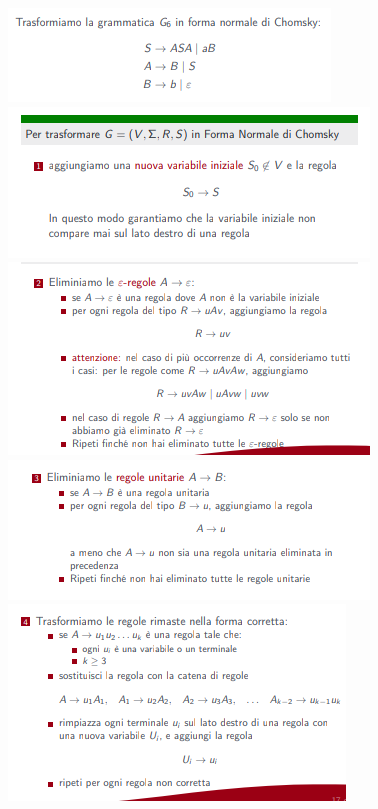 \documentclass[]{article}
\begin{document}
				\begin{center}
					\includegraphics{CHOMSKY1.png}
					\includegraphics{CHOMSKY2.png}
					\includegraphics{CHOMSKY3.png}
					\includegraphics{CHOMSKY4.png}
					\includegraphics{CHOMSKY5.png}
				\end{center}
\end{document}
